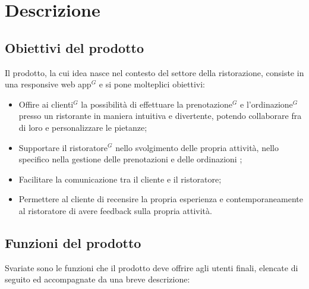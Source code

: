 \section{Descrizione }
\subsection{Obiettivi del prodotto}

Il prodotto, la cui idea nasce nel contesto del settore della ristorazione,
 consiste in una responsive web app$^{G}$ e si pone molteplici obiettivi:
\begin{itemize}
    \item Offire ai clienti$^{G}$ la possibilità di effettuare la prenotazione$^{G}$ e l'ordinazione$^{G}$ presso un ristorante
      in maniera intuitiva e divertente, potendo collaborare fra di loro e personalizzare le pietanze;
    \item Supportare il ristoratore$^{G}$ nello svolgimento delle propria attività, nello specifico nella gestione delle prenotazioni e 
    delle ordinazioni ;
    \item Facilitare la comunicazione tra il cliente e il ristoratore;
    \item Permettere al cliente di recensire la propria esperienza e contemporaneamente al ristoratore di avere
    feedback sulla propria attività.
\end{itemize}

\subsection{Funzioni del prodotto}

Svariate sono le funzioni che il prodotto deve offrire agli utenti finali,
elencate di seguito ed accompagnate da una breve descrizione:

